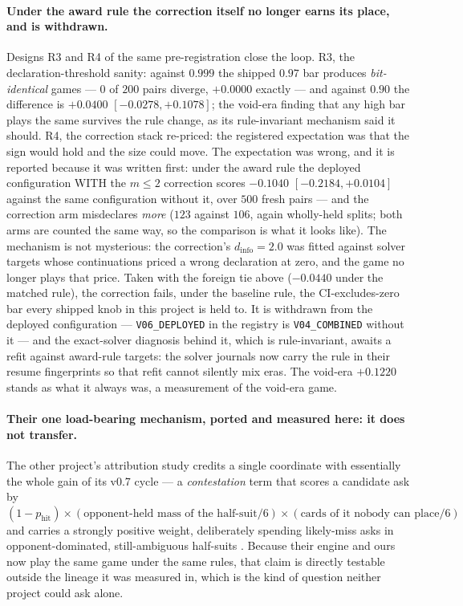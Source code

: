 \documentclass[11pt,a4paper]{article}
\begin{document}
\paragraph{Under the award rule the correction itself no longer earns its
place, and is withdrawn.} Designs R3 and R4 of the same pre-registration
close the loop. R3, the declaration-threshold sanity: against $0.999$ the
shipped $0.97$ bar produces \emph{bit-identical} games --- $0$ of $200$
pairs diverge, $+0.0000$ exactly --- and against $0.90$ the difference is
$+0.0400$ $[-0.0278, +0.1078]$; the void-era finding that any high bar
plays the same survives the rule change, as its rule-invariant mechanism
said it should. R4, the correction stack re-priced: the registered
expectation was that the sign would hold and the size could move. The
expectation was wrong, and it is reported because it was written first:
under the award rule the deployed configuration WITH the $m \le 2$
correction scores $-0.1040$ $[-0.2184, +0.0104]$ against the same
configuration without it, over $500$ fresh pairs --- and the correction arm
misdeclares \emph{more} ($123$ against $106$, again wholly-held splits; both
arms are counted the same way, so the comparison is what it looks like). The mechanism is not
mysterious: the correction's $d_{\text{info}} = 2.0$ was fitted against
solver targets whose continuations priced a wrong declaration at zero, and
the game no longer plays that price. Taken with the foreign tie above
($-0.0440$ under the matched rule), the correction fails, under the
baseline rule, the CI-excludes-zero bar every shipped knob in this project
is held to. It is withdrawn from the deployed configuration ---
\texttt{V06\_DEPLOYED} in the registry is \texttt{V04\_COMBINED} without it
--- and the exact-solver diagnosis behind it, which is rule-invariant,
awaits a refit against award-rule targets: the solver journals now carry
the rule in their resume fingerprints so that refit cannot silently mix
eras. The void-era $+0.1220$ stands as what it always was, a measurement
of the void-era game.

\paragraph{Their one load-bearing mechanism, ported and measured here: it
does not transfer.} The other project's attribution study credits a single
coordinate with essentially the whole gain of its v0.7 cycle --- a
\emph{contestation} term that scores a candidate ask by
$(1 - p_{\text{hit}}) \times (\text{opponent-held mass of the half-suit}/6)
\times (\text{cards of it nobody can place}/6)$ and carries a strongly
positive weight, deliberately spending likely-miss asks in
opponent-dominated, still-ambiguous half-suits
\citep{dylan2026fishbot}. Because their engine and ours now play the same
game under the same rules, that claim is directly testable outside the
lineage it was measured in, which is the kind of question neither project
could ask alone.
\end{document}
